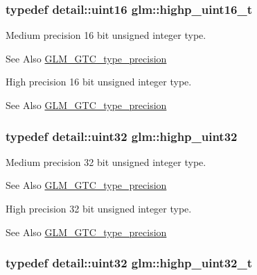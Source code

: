 \hypertarget{group__gtc__type__precision_ga3145bc0ee80432c165e985a188a722b3}{
\subsubsection[{highp\-\_\-uint16\-\_\-t}]{\setlength{\rightskip}{0pt plus 5cm}typedef detail\-::uint16 {\bf glm\-::highp\-\_\-uint16\-\_\-t}}}\label{group__gtc__type__precision_ga3145bc0ee80432c165e985a188a722b3}
Medium precision 16 bit unsigned integer type. \begin{DoxySeeAlso}{See Also}
\hyperlink{group__gtc__type__precision}{G\-L\-M\-\_\-\-G\-T\-C\-\_\-type\-\_\-precision}
\end{DoxySeeAlso}
High precision 16 bit unsigned integer type. \begin{DoxySeeAlso}{See Also}
\hyperlink{group__gtc__type__precision}{G\-L\-M\-\_\-\-G\-T\-C\-\_\-type\-\_\-precision} 
\end{DoxySeeAlso}
\hypertarget{group__gtc__type__precision_ga3145e44c73e2df7dfe4f3cb65974bf22}{
\subsubsection[{highp\-\_\-uint32}]{\setlength{\rightskip}{0pt plus 5cm}typedef detail\-::uint32 {\bf glm\-::highp\-\_\-uint32}}}\label{group__gtc__type__precision_ga3145e44c73e2df7dfe4f3cb65974bf22}
Medium precision 32 bit unsigned integer type. \begin{DoxySeeAlso}{See Also}
\hyperlink{group__gtc__type__precision}{G\-L\-M\-\_\-\-G\-T\-C\-\_\-type\-\_\-precision}
\end{DoxySeeAlso}
High precision 32 bit unsigned integer type. \begin{DoxySeeAlso}{See Also}
\hyperlink{group__gtc__type__precision}{G\-L\-M\-\_\-\-G\-T\-C\-\_\-type\-\_\-precision} 
\end{DoxySeeAlso}
\hypertarget{group__gtc__type__precision_ga8eb85ad460079c63b68866ae34637bda}{
\subsubsection[{highp\-\_\-uint32\-\_\-t}]{\setlength{\rightskip}{0pt plus 5cm}typedef detail\-::uint32 {\bf glm\-::highp\-\_\-uint32\-\_\-t}}}\label{group__gtc__type__precision_ga8eb85ad460079c63b68866ae34637bda}
